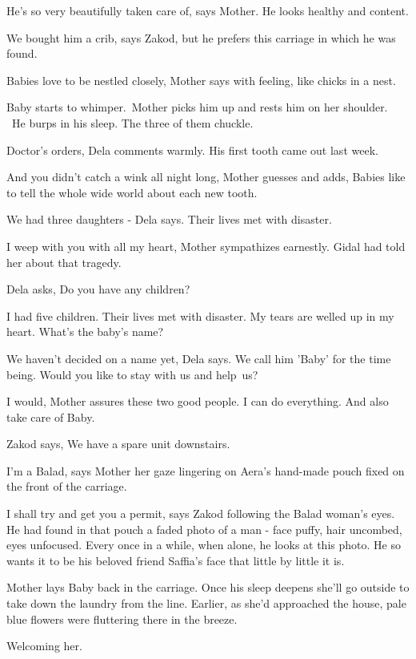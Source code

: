 \documentclass[twoside,11pt]{book}
\begin{document}
{\textquotedbl}He's so very beautifully taken care of,{\textquotedbl} says Mother. {\textquotedbl}He looks healthy and
content.{\textquotedbl} 

{\textquotedbl}We bought him a crib,{\textquotedbl} says Zakod, {\textquotedbl}but he prefers this carriage in which he
was found.{\textquotedbl}

{\textquotedbl}Babies love to be nestled closely,{\textquotedbl} Mother says with feeling, {\textquotedbl}like chicks in
a nest.{\textquotedbl} 

Baby starts to whimper.\ Mother picks him up and rests him on her shoulder. ~He burps in his sleep. The three of them
chuckle. 

{\textquotedbl}Doctor's orders,{\textquotedbl} Dela comments warmly. {\textquotedbl}His first tooth came out last
week.{\textquotedbl}~ 

{\textquotedbl}And you didn't catch a wink all night long,{\textquotedbl} Mother guesses and adds, {\textquotedbl}Babies
like to tell the whole wide world about each new tooth.{\textquotedbl} 

{\textquotedbl}We had three daughters -{\textquotedbl} Dela says. {\textquotedbl}Their lives met with
disaster.{\textquotedbl} 

{\textquotedbl}I weep with you with all my heart,{\textquotedbl} Mother sympathizes earnestly. Gidal had told her about
that tragedy. 

Dela asks, {\textquotedbl}Do you have any children?{\textquotedbl} 

{\textquotedbl}I had five children. Their lives met with disaster. My tears are welled up in my heart. What's the baby's
name?{\textquotedbl} 

{\textquotedbl}We haven't decided on a name yet,{\textquotedbl} Dela says. {\textquotedbl}We call him 'Baby' for the
time being. Would you like to stay with us and help~us?{\textquotedbl} 

{\textquotedbl}I would,{\textquotedbl} Mother assures these two good people. {\textquotedbl}I can do everything. And
also take care of Baby.{\textquotedbl} 

Zakod says, {\textquotedbl}We have a spare unit downstairs.{\textquotedbl} 

{\textquotedbl}I'm a Balad,{\textquotedbl} says Mother her gaze lingering on Aera's hand-made pouch fixed on the front
of the carriage. 

{\textquotedbl}I shall try and get you a permit,{\textquotedbl} says Zakod following the Balad woman's eyes. He had
found in that pouch a faded photo of a man - face puffy, hair uncombed, eyes unfocused. Every once in a while, when
alone, he looks at this photo. He so wants it to be his beloved friend Saffia's face that little by little it is. 

Mother lays Baby back in the carriage. Once his sleep deepens she'll go outside to take down the laundry from the line.
Earlier, as she'd approached the house, pale blue flowers were fluttering there in the breeze. 

Welcoming her.
\end{document}
